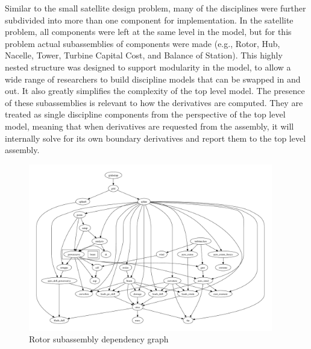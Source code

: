 \documentclass[]{aiaa-tc} %
\begin{document}
    Similar to the small satellite design problem, many of the disciplines were further
    subdivided into more than one component for implementation. In the
    satellite problem, all components were left at the same level in the model, but for this problem
    actual subassemblies of components were made (e.g., Rotor, Hub, Nacelle, Tower, Turbine Capital Cost,
    and Balance of Station). This highly nested structure was designed to support modularity in the model,
    to allow a wide range of researchers to build discipline models that can be swapped in and out.
    It also greatly simplifies the complexity of the top level model.
    The presence of these subassemblies is relevant to how the derivatives are computed.
    They are treated as single discipline components from the perspective of the top level model,
    meaning that when derivatives are requested from the assembly, it will internally solve
    for its own boundary derivatives and report them to the top level assembly.


    \begin{figure}[!htbp]
        \centering
        \includegraphics[width=0.95\textwidth]{images/rotor_depgraph}
        \caption{Rotor subassembly dependency graph}
        \label{fig:wt_sub_depgraph}
    \end{figure}
\end{document}
